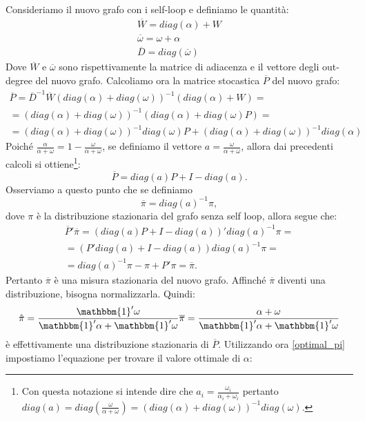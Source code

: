 \begin{alphaparts}
    Consideriamo il nuovo grafo con i self-loop e definiamo le quantità:
    \begin{gather*}
        \overline{W}= diag(\alpha)+ W\\
        \overline{\omega}= \omega+ \alpha\\
        \overline{D}= diag(\overline{\omega})
    \end{gather*}
    Dove \(\overline{W}\) e \(\overline{\omega}\) sono rispettivamente la matrice di adiacenza e il vettore degli out-degree del nuovo grafo. Calcoliamo ora la matrice stocastica \(\overline{P}\) del nuovo grafo:
    \begin{gather*}
        \overline{P}= \overline{D}^{-1}\overline{W}\left(diag(\alpha)+ diag(\omega)\right)^{-1}\left(diag(\alpha)+ W\right)=\\
        =\left(diag(\alpha)+ diag(\omega)\right)^{-1}\left(diag(\alpha)+ diag(\omega)P\right)=\\
        = \left(diag(\alpha)+ diag(\omega)\right)^{-1}diag(\omega)P + \left(diag(\alpha)+ diag(\omega)\right)^{-1}diag(\alpha)
    \end{gather*} 
    Poiché \(\frac{\alpha}{\alpha+ \omega}= 1- \frac{\omega}{\alpha+ \omega}\), se definiamo il vettore \(a= \frac{\omega}{\alpha+ \omega}\), allora dai precedenti calcoli si ottiene\footnote{Con questa notazione si intende dire che \(a_i = \frac{\omega_i}{\alpha_i + \omega_i}\) pertanto \(diag(a) = diag(\frac{\omega}{\alpha+ \omega}) = \left(diag(\alpha)+ diag(\omega)\right)^{-1}diag(\omega) \).}:
    \[\overline{P}= diag(a)P+ I- diag(a).\]
    Osserviamo a questo punto che se definiamo 
    \[\overline{\pi} = diag(a)^{-1}\pi,\]
    dove \(\pi\) è la distribuzione stazionaria del grafo senza self loop, allora segue che:
    \begin{gather*}
        \overline{P}'\overline{\pi}=\left(diag(a)P+ I- diag(a)\right)'diag(a)^{-1}\pi = \\
        = \left(P'diag(a)+ I- diag(a)\right)diag(a)^{-1}\pi= \\
        = diag(a)^{-1}\pi- \pi+ P'\pi = \overline{\pi}.
    \end{gather*}
    Pertanto \(\overline{\pi}\) è una misura stazionaria del nuovo grafo. Affinché \(\overline{\pi}\) diventi una distribuzione, bisogna normalizzarla. Quindi:
    \[\hat{\pi} = \frac{\mathbbm{1}'\omega}{\mathbbm{1}'\alpha+\mathbbm{1}'\omega}\overline{\pi} = \frac{\alpha+ \omega}{\mathbbm{1}'\alpha+\mathbbm{1}'\omega}\]
    è effettivamente una distribuzione stazionaria di \(\overline{P}\). Utilizzando ora \ref{optimal_pi} impostiamo l'equazione per trovare il valore ottimale di \(\alpha\):

\end{alphaparts}
